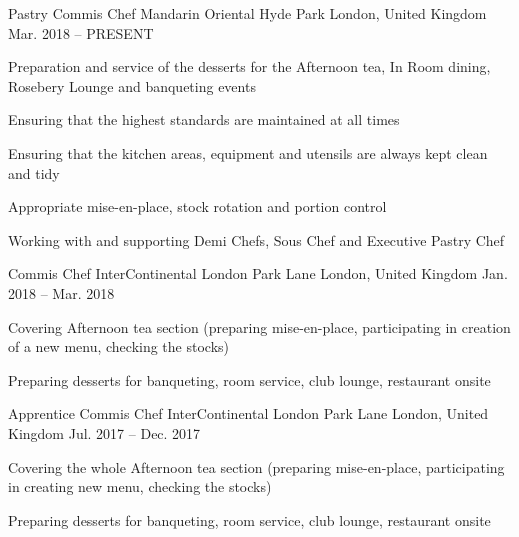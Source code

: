

\begin{cventries}

  \cventry
    {Pastry Commis Chef} %
    {Mandarin Oriental Hyde Park} %
    {London, United Kingdom} %
    {Mar. 2018 -- PRESENT} %
    {
      \begin{cvitems} %
        \item {Preparation and service of the desserts for the Afternoon tea, In Room dining, Rosebery Lounge and banqueting events}
        \item {Ensuring that the highest standards are maintained at all times}
        \item {Ensuring that the kitchen areas, equipment and utensils are always kept clean and tidy}
        \item {Appropriate mise-en-place, stock rotation and portion control}
        \item {Working with and supporting Demi Chefs, Sous Chef and Executive Pastry Chef}
      \end{cvitems}
    }

  \cventry
    {Commis Chef} %
    {InterContinental London Park Lane} %
    {London, United Kingdom} %
    {Jan. 2018 -- Mar. 2018} %
    {
      \begin{cvitems} %
        \item {Covering Afternoon tea section (preparing mise-en-place, participating in creation of a new menu, checking the stocks)}
        \item {Preparing desserts for banqueting, room service, club lounge, restaurant onsite}
      \end{cvitems}
    }

  \cventry
    {Apprentice Commis Chef} %
    {InterContinental London Park Lane} %
    {London, United Kingdom} %
    {Jul. 2017 -- Dec. 2017} %
    {
      \begin{cvitems} %
        \item {Covering the whole Afternoon tea section (preparing mise-en-place, participating in creating new menu, checking the stocks)}
        \item {Preparing desserts for banqueting, room service, club lounge, restaurant onsite}
      \end{cvitems}
    }


\end{cventries}
